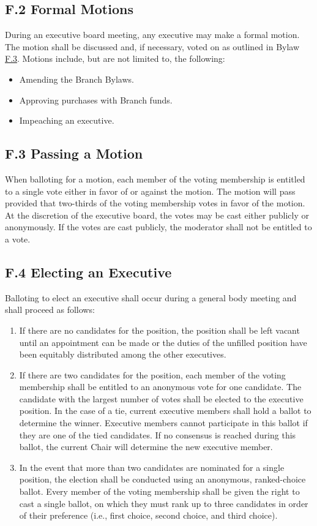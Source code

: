 \documentclass[11pt,a4paper]{article}
\begin{document}
\subsection*{F.2 Formal Motions}
\label{F.2}
During an executive board meeting, any executive may make a formal motion. The motion shall be discussed and, if necessary, voted on as outlined in Bylaw \hyperref[F.3]{F.3}. Motions include, but are not limited to, the following:
\begin{itemize}[noitemsep]
    \item Amending the Branch Bylaws.
    \item Approving purchases with Branch funds.
    \item Impeaching an executive.
\end{itemize}

\subsection*{F.3 Passing a Motion}
\label{F.3}
When balloting for a motion, each member of the voting membership is entitled to a single vote either in favor of or against the motion. The motion will pass provided that two-thirds of the voting membership votes in favor of the motion. At the discretion of the executive board, the votes may be cast either publicly or anonymously. If the votes are cast publicly, the moderator shall not be entitled to a vote.

\subsection*{F.4 Electing an Executive}
\label{F.4}
Balloting to elect an executive shall occur during a general body meeting and shall proceed as follows:
\begin{enumerate}
    \item If there are no candidates for the position, the position shall be left vacant until an appointment can be made or the duties of the unfilled position have been equitably distributed among the other executives.
    
    \item If there are two candidates for the position, each member of the voting membership shall be entitled to an anonymous vote for one candidate. The candidate with the largest number of votes shall be elected to the executive position. In the case of a tie, current executive members shall hold a ballot to determine the winner. Executive members cannot participate in this ballot if they are one of the tied candidates. If no consensus is reached during this ballot, the current Chair will determine the new executive member.
    
    \item In the event that more than two candidates are nominated for a single position, the election shall be conducted using an anonymous, ranked-choice ballot. Every member of the voting membership shall be given the right to cast a single ballot, on which they must rank up to three candidates in order of their preference (i.e., first choice, second choice, and third choice).
\end{enumerate}
\end{document}
